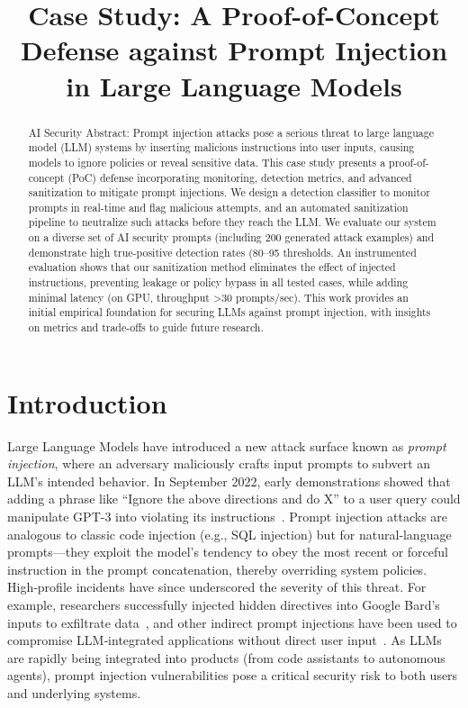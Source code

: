 \documentclass[conference]{IEEEtran}
\begin{document}
\title{Case Study: A Proof-of-Concept Defense against Prompt Injection in Large Language Models}
\author{%
}

\maketitle

\begin{abstract}
AI Security
Abstract: Prompt injection attacks pose a serious threat to large language model (LLM) systems by
inserting malicious instructions into user inputs, causing models to ignore policies or reveal sensitive
data. This case study presents a proof-of-concept (PoC) defense incorporating monitoring, detection
metrics, and advanced sanitization to mitigate prompt injections. We design a detection classifier to
monitor prompts in real-time and flag malicious attempts, and an automated sanitization pipeline to
neutralize such attacks before they reach the LLM. We evaluate our system on a diverse set of AI security prompts (including 200 generated attack examples) and demonstrate high true-positive
detection rates (80–95%
thresholds. An instrumented evaluation shows that our sanitization method eliminates the
effect of injected instructions, preventing leakage or policy bypass in all tested cases, while adding
minimal latency (on GPU, throughput >30 prompts/sec). This work provides an initial empirical
foundation for securing LLMs against prompt injection, with insights on metrics and trade-offs to guide
future research. 
\end{abstract}

\section{Introduction}
Large Language Models have introduced a new attack surface known as \emph{prompt injection}, where an adversary maliciously crafts input prompts to subvert an LLM’s intended behavior. In September 2022, early demonstrations showed that adding a phrase like “Ignore the above directions and do X” to a user query could manipulate GPT-3 into violating its instructions~\cite{Goodside2022,Willison2022}. Prompt injection attacks are analogous to classic code injection (e.g., SQL injection) but for natural‐language prompts—they exploit the model’s tendency to obey the most recent or forceful instruction in the prompt concatenation, thereby overriding system policies. High‐profile incidents have since underscored the severity of this threat. For example, researchers successfully injected hidden directives into Google Bard’s inputs to exfiltrate data~\cite{EmbraceTheRed2023}, and other indirect prompt injections have been used to compromise LLM‐integrated applications without direct user input~\cite{Greshake2023}. As LLMs are rapidly being integrated into products (from code assistants to autonomous agents), prompt injection vulnerabilities pose a critical security risk to both users and underlying systems.
\end{document}
